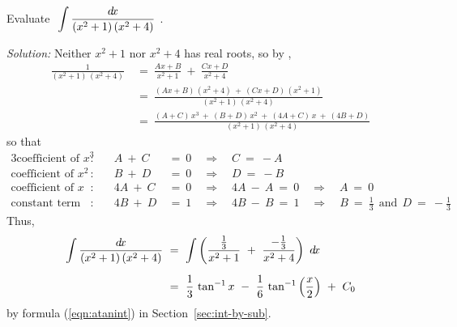 \label{cmnt:part-frac-case-3}
\newpage
\begin{exmp}\label{exmp:partfrac4}
\noindent Evaluate $~\displaystyle\int \frac{d\!x}{(x^2+1)\,(x^2+4)}~$.\vspace{1mm}
\par\noindent\emph{Solution:} Neither $x^2 + 1$ nor $x^2 + 4$ has real roots,
so by ,
\begin{align*}
\frac{1}{(x^2+1)\,(x^2+4)} ~&=~ \frac{Ax+B}{x^2+1} ~+~ \frac{Cx+D}{x^2+4}\\[4pt]
&=~ \frac{(Ax+B)\,(x^2+4) ~+~ (Cx+D)\,(x^2+1)}{(x^2+1)\,(x^2+4)}\\[4pt]
&=~ \frac{(A+C)\,x^3 ~+~ (B+D)\,x^2 ~+~ (4A+C)\,x ~+~ (4B+D)}{(x^2+1)\,(x^2+4)}
\end{align*}
so that
\begin{alignat*}{3}
\text{coefficient of $x^3$}&: \quad & A ~+~ C ~&=~ 0 \quad\Rightarrow\quad C ~=~ -A\\
\text{coefficient of $x^2$}&: \quad & B ~+~ D ~&=~ 0 \quad\Rightarrow\quad D ~=~ -B\\
\text{coefficient of $x$}&: \quad & 4A ~+~ C ~&=~ 0 \quad\Rightarrow\quad 4A ~-~ A ~=~ 0
 \quad\Rightarrow\quad A ~=~ 0\\
\text{constant term}&: & 4B ~+~ D ~&=~ 1 \quad\Rightarrow\quad 4B ~-~ B ~=~ 1
\quad\Rightarrow\quad B ~=~ \frac{1}{3} ~~\text{and}~~ D ~=~ -\frac{1}{3}
\end{alignat*}
Thus,
\begin{align*}
\int \frac{d\!x}{(x^2+1)\,(x^2+4)} ~&=~ \int \left(\frac{\frac{1}{3}}{x^2+1} ~+~
 \frac{-\frac{1}{3}}{x^2+4}\right)~d\!x\\[6pt]
&=~ \frac{1}{3}\,\tan^{-1} x ~-~ \frac{1}{6}\,\tan^{-1}\left(\frac{x}{2}\right) ~+~ C_0
\end{align*}
by formula (\ref{eqn:atanint}) in Section~\ref{sec:int-by-sub}.
\end{exmp}
\divider
\vspace{2mm}


